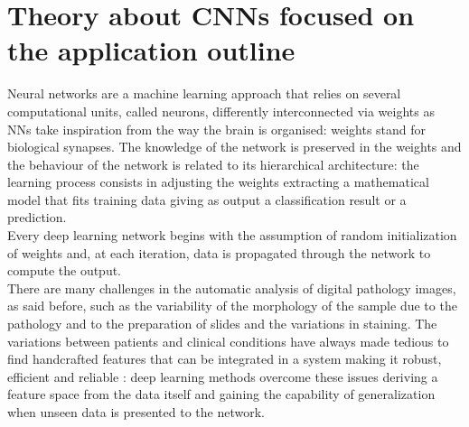 \documentclass[12pt]{article}
\begin{document}
\section{Theory about CNNs focused on the application outline}
Neural networks are a machine learning approach that relies on several computational units, called neurons, differently interconnected via weights as NNs take inspiration from the way the brain is organised: weights stand for biological synapses. The knowledge of the network is preserved in the weights and the behaviour of the network is related to its hierarchical architecture: the learning process consists in adjusting the weights extracting a mathematical model that fits training data giving as output a classification result or a prediction. \cite{digpat1}\\
Every deep learning network begins with the assumption of random initialization of weights and, at each iteration, data is propagated through the network to compute the output.\\ There are many challenges in the automatic analysis of digital pathology images, as said before, such as the variability of the morphology of the sample due to the pathology and to the preparation of slides and the variations in staining. 
The variations between patients and clinical conditions have always made tedious to find handcrafted features that can be integrated in a system making it robust, efficient and reliable : deep learning methods overcome these issues deriving a feature space from the data itself and gaining the capability of generalization when unseen data is presented to the network. \cite{digpat4} \\
\end{document}
